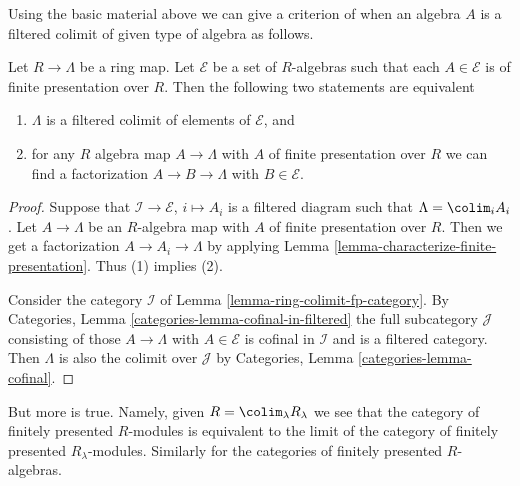 \noindent
Using the basic material above we can give a criterion of when
an algebra $A$ is a filtered colimit of given type of algebra
as follows.

\begin{lemma}
\label{lemma-when-colimit}
Let $R \to \Lambda$ be a ring map. Let $\mathcal{E}$ be a set of $R$-algebras
such that each $A \in \mathcal{E}$ is of finite presentation over $R$.
Then the following two statements are equivalent
\begin{enumerate}
\item $\Lambda$ is a filtered colimit of elements of $\mathcal{E}$, and
\item for any $R$ algebra map $A \to \Lambda$ with $A$ of finite
presentation over $R$ we can find a factorization $A \to B \to \Lambda$
with $B \in \mathcal{E}$.
\end{enumerate}
\end{lemma}

\begin{proof}
Suppose that $\mathcal{I} \to \mathcal{E}$, $i \mapsto A_i$
is a filtered diagram such that $\Lambda = \colim_i A_i$.
Let $A \to \Lambda$ be an $R$-algebra map with $A$ of finite
presentation over $R$. Then we get a factorization $A \to A_i \to \Lambda$
by applying Lemma \ref{lemma-characterize-finite-presentation}.
Thus (1) implies (2).

\medskip\noindent
Consider the category
$\mathcal{I}$ of Lemma \ref{lemma-ring-colimit-fp-category}.
By Categories, Lemma \ref{categories-lemma-cofinal-in-filtered}
the full subcategory $\mathcal{J}$ consisting of those
$A \to \Lambda$ with $A \in \mathcal{E}$ is cofinal in $\mathcal{I}$ and
is a filtered category. Then $\Lambda$ is also the colimit
over $\mathcal{J}$ by Categories, Lemma \ref{categories-lemma-cofinal}.
\end{proof}

\noindent
But more is true. Namely, given $R = \colim_\lambda R_\lambda$
we see that the category of finitely presented $R$-modules is equivalent
to the limit of the category of finitely presented $R_\lambda$-modules.
Similarly for the categories of finitely presented $R$-algebras.

